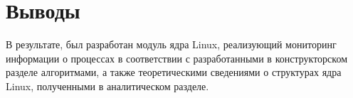 




\section*{Выводы}
В результате, был разработан модуль ядра Linux, реализующий мониторинг информации о процессах в соответствии с разработанными в конструкторском разделе алгоритмами, а также теоретическими сведениями о структурах ядра Linux, полученными в аналитическом разделе.